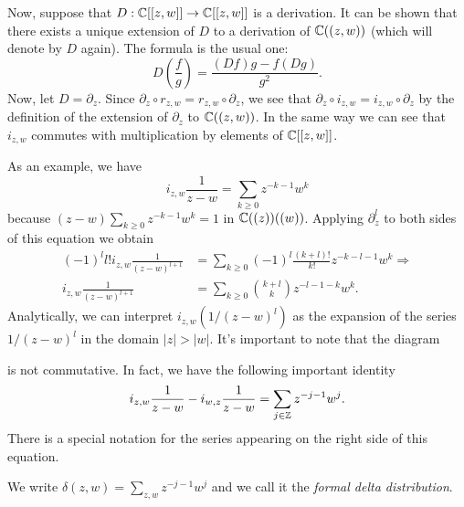 Now, suppose that $D:\mathbb{C}[[z,w]]\rightarrow \mathbb{C}[[z,w]]$ is a derivation. It can be shown that there exists a unique extension of $D$ to a derivation of $\mathbb{C}((z,w))$ (which will denote by $D$ again). The formula is the usual one:
\begin{equation}
    D\left(\frac{f}{g}\right)= \frac{(Df)g-f(Dg)}{g^2}.
\end{equation}
Now, let $D=\partial_z$. Since $\partial_z\circ r_{z,w}=r_{z,w}\circ \partial_z$, we see that $\partial_z\circ i_{z,w}=i_{z,w}\circ\partial_z$ by the definition of the extension of $\partial_z$ to $ \mathbb{C}((z,w))$. In the same way we can see that $i_{z,w}$ commutes with multiplication by elements of $\mathbb{C}[[z,w]]$.\par
As an example, we have
\begin{equation}
    i_{z,w}\frac{1}{z-w}=\sum_{k\geq0}z^{-k-1}w^k
\end{equation}
because $(z-w)\sum_{k\geq0}z^{-k-1}w^k=1$ in $\mathbb{C}((z))((w))$. Applying $\partial_z^l$ to both sides of this equation we obtain
\begin{equation}
\begin{split}
     (-1)^ll!i_{z,w}\frac{1}{(z-w)^{l+1}}&=\sum_{k\geq0} (-1)^l\frac{(k+l)!}{k!}z^{-k-l-1}w^k\Rightarrow \\
     i_{z,w}\frac{1}{(z-w)^{l+1}}&=\sum_{k\geq0}\binom{k+l}{k}z^{-l-1-k}w^k.
     \end{split}
\end{equation}
Analytically, we can interpret $i_{z,w}(1/(z-w)^l)$ as the expansion of the series $1/(z-w)^l$ in the domain $|z|>|w|$. It's important to note that the diagram
\begin{center}
\end{center}
is not commutative. In fact, we have the following important identity
\begin{equation}\label{Equation: formal delta distribution identity}
    i_{z,w}\frac{1}{z-w}-i_{w,z}\frac{1}{z-w}=\sum_{j\in\mathbb{Z}}z^{-j-1}w^j.
\end{equation}
There is a special notation for the series appearing on the right side of this equation.
\begin{dang}
    \begin{notation}
        We write $\delta(z,w)=\sum_{z,w}z^{-j-1}w^j$ and we call it the \textit{formal delta distribution}.
    \end{notation}
\end{dang}
